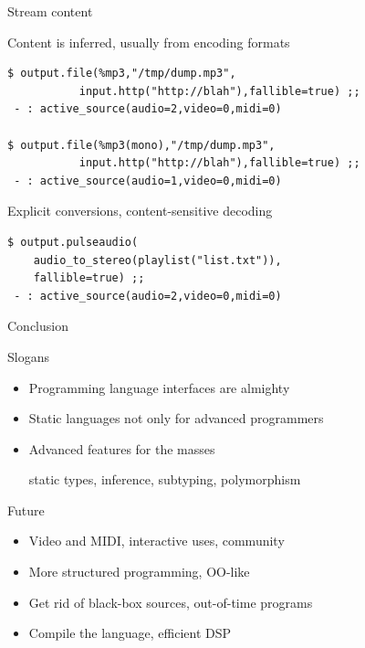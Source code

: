 \documentclass{beamer}
\renewcommand{\emph}[1]{\alert{#1}}
\renewcommand{\textbf}[1]{{\color{blue} #1}}
\begin{document}
\begin{frame}[fragile]{Stream content}

\vfill

\textbf{Content is inferred}, usually from encoding formats
\begin{lstlisting}
$ output.file(%mp3,"/tmp/dump.mp3",
           input.http("http://blah"),fallible=true) ;;
 - : active_source(audio=2,video=0,midi=0)

$ output.file(%mp3(mono),"/tmp/dump.mp3",
           input.http("http://blah"),fallible=true) ;;
 - : active_source(audio=1,video=0,midi=0)
\end{lstlisting}

\vfill

Explicit conversions, \textbf{content-sensitive} decoding
\begin{lstlisting}
$ output.pulseaudio(
    audio_to_stereo(playlist("list.txt")),
    fallible=true) ;;
 - : active_source(audio=2,video=0,midi=0)
\end{lstlisting}

\end{frame}



\begin{frame}{Conclusion}

\begin{block}{Slogans}
\begin{itemize}
\item Programming language interfaces are almighty
\item Static languages not only for advanced programmers
\item Advanced features for the masses \\
\begin{flushright}
  {\small static types, inference, subtyping, polymorphism}
\end{flushright}
\end{itemize}
\end{block}

\vfill

\begin{block}{Future}
\begin{itemize}
\item Video and MIDI, interactive uses, community
\item More structured programming, OO-like
\item Get rid of \emph{black-box sources}, out-of-time programs
\item \emph{Compile} the language, efficient DSP
\end{itemize}
\end{block}

\end{frame}
\end{document}
